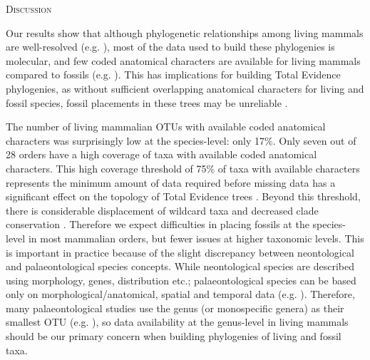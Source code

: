 \documentclass[12pt,letterpaper]{article}
\renewcommand{\section}[1]{%
\bigskip
\begin{center}
\begin{Large}
\normalfont\scshape #1
\medskip
\end{Large}
\end{center}}
\begin{document}
\section{Discussion}
Our results show that although phylogenetic relationships among living mammals are well-resolved (e.g. \cite{BinindaEmonds,meredithimpacts2011}), most of the data used to build these phylogenies is molecular, and few coded anatomical characters are available for living mammals compared to fossils (e.g. \cite{O'Leary08022013,ni2013oldest}).
This has implications for building Total Evidence phylogenies, as without sufficient overlapping anatomical characters for living and fossil species, fossil placements in these trees may be unreliable \cite{GuillermeCooper}.

The number of living mammalian OTUs with available coded anatomical characters was surprisingly low at the species-level: only 17\%.
Only seven out of 28 orders have a high coverage of taxa with available coded anatomical characters.
This high coverage threshold of 75\% of taxa with available characters represents the minimum amount of data required before missing data has a significant effect on the topology of Total Evidence trees \cite{GuillermeCooper}.
Beyond this threshold, there is considerable displacement of wildcard taxa and decreased clade conservation \cite{GuillermeCooper}.
Therefore we expect difficulties in placing fossils at the species-level in most mammalian orders, but fewer issues at higher taxonomic levels.
This is important in practice because of the slight discrepancy between neontological and palaeontological species concepts.
While neontological species are described using morphology, genes, distribution etc.; palaeontological species can be based only on morphological/anatomical, spatial and temporal data (e.g. \cite{ni2013oldest}).
Therefore, many palaeontological studies use the genus (or monospecific genera) as their smallest OTU (e.g. \cite{ni2013oldest,O'Leary08022013}), so data availability at the genus-level in living mammals should be our primary concern when building phylogenies of living and fossil taxa.
\end{document}
